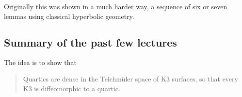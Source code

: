 \begin{remark}\leavevmode
	Originally this was shown in a much harder way, a sequence of six or seven lemmas using classical hyperbolic geometry.
\end{remark}

\subsection{Summary of the past few lectures}

The idea is to show that

{\color{8}\begin{quotation}
	Quartics are dense in the Teichmüler space of K3 surfaces, so that every K3 is diffeomorphic to a quartic.
\end{quotation}}

